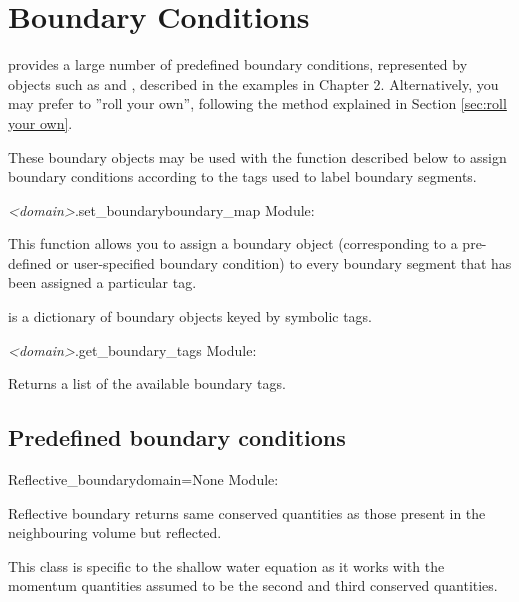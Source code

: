 \documentclass{manual}
\begin{document}
\section{Boundary Conditions}
\label{sec:boundary conditions}

\anuga provides a large number of predefined boundary conditions,
represented by objects such as  and
, described in the examples
in Chapter 2. Alternatively, you may prefer to ''roll your own'',
following the method explained in Section \ref{sec:roll your own}.

These boundary objects may be used with the function  described below
to assign boundary conditions according to the tags used to label boundary segments.

\begin{methoddesc}{\emph{<domain>}.set_boundary}{boundary_map}
Module: 

This function allows you to assign a boundary object (corresponding to a
pre-defined or user-specified boundary condition) to every boundary segment that
has been assigned a particular tag.

 is a dictionary of boundary objects keyed by symbolic tags.
\end{methoddesc}

\begin{methoddesc} {\emph{<domain>}.get_boundary_tags}{}
Module: 

Returns a list of the available boundary tags.
\end{methoddesc}

\subsection{Predefined boundary conditions}

\begin{classdesc}{Reflective_boundary}{domain=None}
Module: 

Reflective boundary returns same conserved quantities as those present in
the neighbouring volume but reflected.

This class is specific to the shallow water equation as it works with the
momentum quantities assumed to be the second and third conserved quantities.
\end{classdesc}
\end{document}
